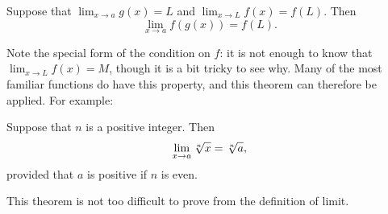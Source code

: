 \begin{theorem}\label{thm:limit of composition}
Suppose that $\lim_{x\to a}g(x)=L$ and $\lim_{x\to L}f(x)=f(L)$. Then
\[
\lim_{x\to a} f(g(x)) = f(L).
\]
\end{theorem}

Note the special form of the condition on $f$: it is not enough to
know that $\lim_{x\to L}f(x) = M$, though it is a bit tricky to see
why. Many of the most familiar functions do have this property, and
this theorem can therefore be applied. For example:

\begin{theorem} Suppose that $n$ is a positive integer. Then
$$\lim_{x\to a}\root n\of{x} = \root n\of{a},$$
provided that $a$ is positive if $n$ is even.
\label{thm:continuity of roots}
\end{theorem}

This theorem is not too difficult to prove from the definition of limit.









